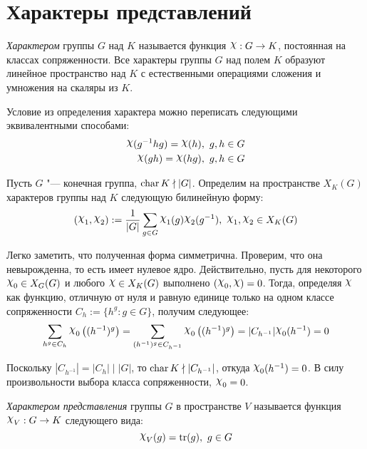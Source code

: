 \section{Характеры представлений}

\begin{definition}
	\textit{Характером} группы $G$ над $K$ называется функция $\Chi : G \to K$, постоянная на классах сопряженности. Все характеры группы $G$ над полем $K$ образуют линейное пространство над $K$ с естественными операциями сложения и умножения на скаляры из $K$.
\end{definition}

\begin{note}
	Условие из определения характера можно переписать следующими эквивалентными способами:
	\begin{align*}
		\Chi(g^{-1}hg) = \Chi(h),~g, h \in G\\
		\Chi(gh) = \Chi(hg),~g, h \in G
	\end{align*}
\end{note}

\begin{note}
	Пусть $G$ "--- конечная группа, $\operatorname{char} K \nmid |G|$. Определим на пространстве $X_K(G)$ характеров группы над $K$ следующую билинейную форму:
	\[(\Chi_1, \Chi_2) := \frac1{|G|}\sum_{g \in G}\Chi_1(g)\Chi_2(g^{-1}),~\Chi_1, \Chi_2 \in X_K(G)\]
	
	Легко заметить, что полученная форма симметрична. Проверим, что она невырожденна, то есть имеет нулевое ядро. Действительно, пусть для некоторого $\Chi_0 \in X_G(G)$ и любого $\Chi \in X_K(G)$ выполнено $(\Chi_0, \Chi) = 0$. Тогда, определяя $\Chi$ как функцию, отличную от нуля и равную единице только на одном классе сопряженности $C_h := \{h^g : g \in G\}$, получим следующее:
	\[\sum_{h^g \in C_h}\Chi_0\left((h^{-1})^g\right) = \sum_{(h^{-1})^g \in C_{h^{-1}}}\Chi_0\left((h^{-1})^g\right) = |C_{h^{-1}}| \Chi_0(h^{-1}) = 0\]
	
	Поскольку $|C_{h^{-1}}| = |C_h| \mid |G|$, то $\operatorname{char} K \nmid |C_{h^{-1}}|$, откуда $\Chi_0(h^{-1}) = 0$. В силу произвольности выбора класса сопряженности, $\Chi_0 = 0$.
\end{note}

\begin{definition}
	\textit{Характером представления} группы $G$ в пространстве $V$ называется функция $\Chi_V: G \to K$ следующего вида:
	\[\Chi_V(g) = \tr(g),~g \in G\]
\end{definition}

